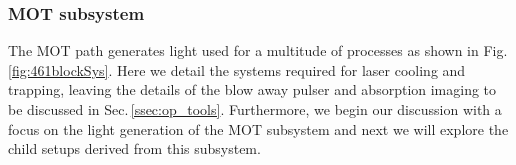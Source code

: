 %	
%		
		
\subsubsection{MOT subsystem} \label{sec:motsubsystem}
The MOT path generates light used for a multitude of processes as shown in Fig.\,\ref{fig:461blockSys}.
Here we detail the systems required for laser cooling and trapping, leaving the details of the blow away pulser and absorption imaging to be discussed in Sec.\,\ref{ssec:op_tools}.
Furthermore, we begin our discussion with a focus on the light generation of the MOT subsystem and next we will explore the child setups derived from this subsystem.


